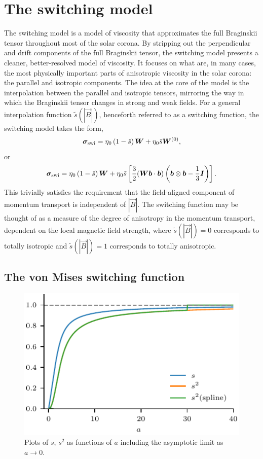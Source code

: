 \section{The switching model}

The switching model is a model of viscosity that approximates the full Braginskii tensor throughout most of the solar corona. By stripping out the perpendicular and drift components of the full Braginskii tensor, the switching model presents a cleaner, better-resolved model of viscosity. It focuses on what are, in many cases, the most physically important parts of anisotropic viscosity in the solar corona: the parallel and isotropic components. The idea at the core of the model is the interpolation between the parallel and isotropic tensors, mirroring the way in which the Braginskii tensor changes in strong and weak fields. For a general interpolation function $\tilde{s}(|\vec{B}|)$, henceforth referred to as a switching function, the switching model takes the form,
\begin{equation}
  \label{eq:switching_model_simple}
{\bm \sigma}_{\text{swi}} = \eta_0 \left( 1 - \tilde{s} \right) {\bm W} + \eta_0 \tilde{s} {\bm W}^{(0)},
\end{equation}
or
\begin{equation}
  \label{eq:switching_model}
{\bm \sigma}_{\text{swi}} = \eta_0 \left( 1 - \tilde{s} \right) {\bm W} + \eta_0 \tilde{s} \left[\frac{3}{2}({\bm W}{\bm b}\cdot{\bm b}) \left( {\bm b} \otimes {\bm b} - \frac{1}{3}{\bm I} \right)\right].
\end{equation}
This trivially satisfies the requirement that the field-aligned component of momentum transport is independent of $|\vec{B}|$. The switching function may be thought of as a measure of the degree of anisotropy in the momentum transport, dependent on the local magnetic field strength, where $\tilde{s}(|\vec{B}|) = 0$ corresponds to totally isotropic and $\tilde{s}(|\vec{B}|) = 1$ corresponds to totally anisotropic.

\subsection{The von Mises switching function}

\begin{figure}[t]
  \centering
  \includegraphics[width=0.5\linewidth]{s_against_a.pdf}
  \caption{Plots of $s$, $s^2$ as functions of $a$ including the asymptotic limit as $a \to 0$.}%
  \label{fig:s_against_a}
\end{figure}

